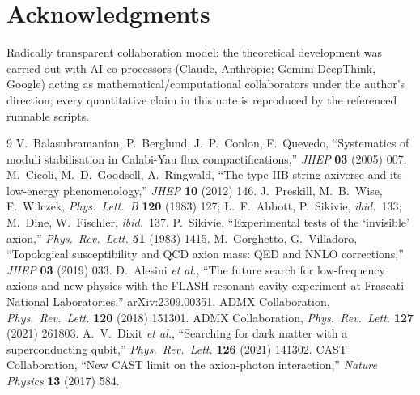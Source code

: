 \documentclass[11pt]{article}
\begin{document}
\section*{Acknowledgments}
Radically transparent collaboration model: the theoretical development was carried out with AI
co-processors (Claude, Anthropic; Gemini DeepThink, Google) acting as mathematical/computational
collaborators under the author's direction; every quantitative claim in this note is reproduced by
the referenced runnable scripts.

\begin{thebibliography}{9}
 V.~Balasubramanian, P.~Berglund, J.~P.~Conlon, F.~Quevedo,
``Systematics of moduli stabilisation in Calabi-Yau flux compactifications,''
\emph{JHEP} \textbf{03} (2005) 007.
 M.~Cicoli, M.~D.~Goodsell, A.~Ringwald,
``The type IIB string axiverse and its low-energy phenomenology,''
\emph{JHEP} \textbf{10} (2012) 146.
 J.~Preskill, M.~B.~Wise, F.~Wilczek, \emph{Phys.\ Lett.\ B} \textbf{120} (1983)
127; L.~F.~Abbott, P.~Sikivie, \emph{ibid.}\ 133; M.~Dine, W.~Fischler, \emph{ibid.}\ 137.
 P.~Sikivie, ``Experimental tests of the `invisible' axion,''
\emph{Phys.\ Rev.\ Lett.} \textbf{51} (1983) 1415.
 M.~Gorghetto, G.~Villadoro,
``Topological susceptibility and QCD axion mass: QED and NNLO corrections,''
\emph{JHEP} \textbf{03} (2019) 033.
 D.~Alesini \emph{et al.},
``The future search for low-frequency axions and new physics with the FLASH resonant cavity
experiment at Frascati National Laboratories,'' arXiv:2309.00351.
 ADMX Collaboration, \emph{Phys.\ Rev.\ Lett.} \textbf{120} (2018) 151301.
 ADMX Collaboration, \emph{Phys.\ Rev.\ Lett.} \textbf{127} (2021) 261803.
 A.~V.~Dixit \emph{et al.},
``Searching for dark matter with a superconducting qubit,''
\emph{Phys.\ Rev.\ Lett.} \textbf{126} (2021) 141302.
 CAST Collaboration, ``New CAST limit on the axion-photon interaction,''
\emph{Nature Physics} \textbf{13} (2017) 584.
\end{thebibliography}
\end{document}
